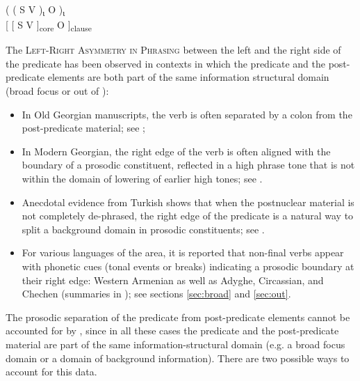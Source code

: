 \documentclass[output=paper,colorlinks,citecolor=brown]{langscibook}
\begin{document}
\ea \label{ex:svo}
        \gll \textup{(} \textup{(} \textup{S} \textup{V} \textup{)\textsubscript{ι}}  \textup{O} \textup{)\textsubscript{ι}}\\
        {[} {[} S V {]}\textsubscript{core} O  {]}\textsubscript{clause}\\
\z

The \textsc{Left-Right Asymmetry in Phrasing} between the left and the right side of the predicate has been observed in contexts in which the predicate and the post-predicate elements are both part of the same information structural domain (broad focus or out of ):

\begin{itemize}
    \item In Old Georgian manuscripts, the verb is often separated by a colon from the post-predicate material; see  \citep{boeder_phrasing_1991};
    \item In Modern Georgian, the right edge of the verb is often aligned with the boundary of a prosodic constituent, reflected in a high phrase tone that is not within the domain of  lowering of earlier high tones; see .
    \item Anecdotal evidence from Turkish shows that when the postnuclear material is not completely de-phrased, the right edge of the predicate is a natural way to split a background domain in prosodic constituents; see .
    \item For various languages of the area, it is reported that non-final verbs appear with phonetic cues (tonal events or breaks) indicating a prosodic boundary at their right edge: Western Armenian \citep[]{donabedian-demopoulos_middle_2018} as well as Adyghe, Circassian, and Chechen (summaries in \citealt[]{borise_tone_2021}); see sections \ref{sec:broad} and \ref{sec:out}.
\end{itemize}

The prosodic separation of the predicate from post-predicate elements cannot be accounted for by , since in all these cases the predicate and the post-predicate material are part of the same information-structural domain (e.g. a broad focus domain or a domain of background information). There are two possible ways to account for this data. 
\end{document}
